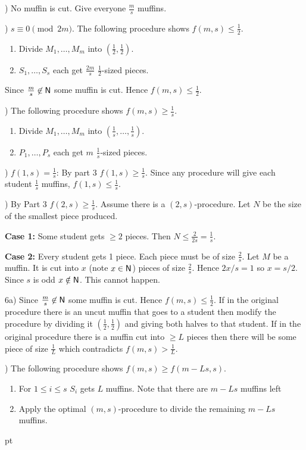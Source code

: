 \documentclass[12pt]{article}
\newcommand{\nat}{{\sf N}}
\newenvironment{proof}
    {\pagebreak[1]{\narrower\noindent {\bf Proof:\quad\nopagebreak}}}{\QED}
\newcommand{\yyskip}{\penalty-50\vskip 5pt plus 3pt minus 2pt}
\newcommand{\blackslug}{\hbox{\hskip 1pt
        \vrule width 4pt height 8pt depth 1.5pt\hskip 1pt}}
\newcommand{\QED}{{\penalty10000\parindent 0pt\penalty10000
        \hskip 8 pt\nolinebreak\blackslug\hfill\lower 8.5pt\null}
        \par\yyskip\pagebreak[1]}
\begin{document}
\begin{proof}

) No muffin is cut. Give everyone $\frac{m}{s}$ muffins.

\bigskip

) $s\equiv 0 \pmod {2m}$. The following procedure shows $f(m,s) \le \frac{1}{2}$.

\begin{enumerate}
\item
Divide $M_1,\ldots,M_m$ into $(\frac{1}{2},\frac{1}{2})$. 
\item
$S_1,\ldots,S_s$ each get $\frac{2m}{s}$ $\frac{1}{2}$-sized pieces.
\end{enumerate}

Since $\frac{m}{s}\not\in\nat$ some muffin is cut. Hence $f(m,s)\le\frac{1}{2}$.

\bigskip

) The following procedure shows $f(m,s) \ge \frac{1}{s}$.
\begin{enumerate}
\item
Divide $M_1,\ldots,M_m$ into $(\frac{1}{s},\ldots,\frac{1}{s})$.
\item
$P_1,\ldots,P_s$ each get $m$ $\frac{1}{s}$-sized pieces.
\end{enumerate}

\bigskip

) $f(1,s)=\frac{1}{s}$:
By part 3 $f(1,s) \ge \frac{1}{s}$. Since any procedure will give each student
$\frac{1}{s}$ muffins, $f(1,s) \le \frac{1}{s}$.

\bigskip

) By Part 3 $f(2,s)\ge \frac{1}{s}$.
Assume there is a $(2,s)$-procedure.
Let $N$ be the size of the smallest piece produced.

\noindent
{\bf Case 1:} Some student gets $\ge 2$ pieces. Then $N\le \frac{2}{2s}=\frac{1}{s}$.

\noindent
{\bf Case 2:} Every student gets 1 piece. Each piece must be of size $\frac{2}{s}$.
Let $M$ be a muffin. It is cut into $x$ (note $x\in\nat$) pieces of size $\frac{2}{s}$. Hence
$2x/s=1$ so $x=s/2$. Since $s$ is odd $x\notin \nat$. This cannot happen.

\noindent
6a) 
Since $\frac{m}{s}\not\in\nat$ some muffin is cut. Hence $f(m,s)\le\frac{1}{2}$.
If in the original procedure there is an uncut muffin that goes to a student then
modify the procedure by dividing it $(\frac{1}{2},\frac{1}{2})$ and giving both halves to that student.
If in the original procedure there is a muffin cut into $\ge L$ pieces then there will be some
piece of size $\frac{1}{L}$ which contradicts $f(m,s)>\frac{1}{L}$. 

) The following procedure shows $f(m,s) \ge f(m-Ls,s)$.

\begin{enumerate}
\item
For $1\le i \le s$ $S_i$ gets $L$ muffins.
Note that there are $m-Ls$ muffins left
\item
Apply the optimal $(m,s)$-procedure to divide the remaining $m-Ls$ muffins.
\end{enumerate}
\end{proof}
\end{document}
